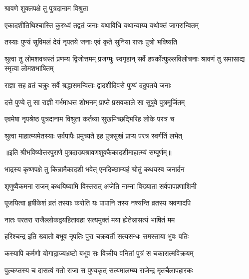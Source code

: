 \onelineshloka
{श्रावणे शुक्लपक्षे तु पुत्रदानाम विश्रुता} %

\twolineshloka
{एकादशीतिथिश्चास्ति कुरुध्वं तद्वतं जनाः}
{यथाविधि यथान्याय्य यथोक्तं जागरान्वितम्} %

\twolineshloka
{तस्याः पुण्यं सुविमलं देयं नृपतये जनाः}
{एवं कृते सुनिया राजः पुत्रो भविष्यति} %

\threelineshloka
{श्रुत्वा तु लोमशवचस्तं प्रणम्य द्विजोत्तमम्}
{प्रजग्मुः स्वगृहान् सर्वे हषर्कोत्फुल्लविलोचनाः}
{श्रावणं तु समासाद्य स्मृत्वा लोमशभाषितम्} %

\twolineshloka
{राज्ञा सह व्रतं चक्रुः सर्वे श्रद्धासमन्विताः}
{द्वादशीदिवसे पुण्यं ददुपतये जनाः} %

\twolineshloka
{दत्ते पुण्ये तु सा राज्ञी गर्भमाधत्त शोभनम्}
{प्राप्ते प्रसवकाले सा सुषुवे पुत्रमूर्जितम्} %

\twolineshloka
{एवमेषा नृपश्रेष्ठ पुत्रदानाम विश्रुता}
{कर्तव्या सुखमिच्छद्भिरिह लोके परत्र च} %

\twolineshloka
{श्रुत्वा माहात्म्यमेतस्याः सर्वपापैः प्रमुच्यते}
{इह पुत्रसुखं प्राप्य परत्र स्वर्गतिं लभेत्} %

॥इति श्रीभविष्योत्तरपुराणे पुत्रदाख्यश्रावणशुक्कैकादशीमाहात्म्यं सम्पूर्णम्॥


\hyperref[sec:ekadashi_mahatmyam_vrata_raja]{\closesub}
\clearpage

\label{sec:vrata-raja-bhadrapada-krishnaja}


\twolineshloka
{भाद्रस्य कृष्णपक्षे तु किन्नामैकादशी भवेत्}
{एनदिच्छाम्यहं श्रोतुं कथयस्व जनार्दन} %


\twolineshloka
{शृणुष्वैकमना राजन् कथयिष्यामि विस्तरात्}
{अजेति नाम्ना विख्याता सर्वपापप्रणाशिनी} %

\twolineshloka
{पूजयित्वा हृषीकेशं व्रतं तस्याः करोति यः}
{पापानि तस्य नश्यन्ति व्रतस्य श्रवणादपि} %

\twolineshloka
{नातः परतरा राजैल्लोकद्वयहितावहा}
{सत्यमुक्तं मया ह्येतेन्नासत्यं भाषितं मम} %

\twolineshloka
{हरिश्चन्द्र इति ख्यातो बभूव नृपतिः पुरा}
{चक्रवर्ती सत्यसन्धः समस्ताया भुवः पतिः} %

\twolineshloka
{कस्यापि कर्मणो योगाद्राज्यभ्रष्टो बभूव सः}
{विक्रीय वनितां पुत्रं स चकारात्मविक्रयम्} %

\twolineshloka
{पुल्कप्तस्य च दासत्वं गतो राजा स पुण्यकृत्}
{सत्यमालम्ब्य राजेन्द्र मृतचैलापहारकः} %

